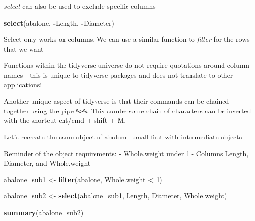 \documentclass[
]{book}
\newenvironment{Shaded}{\begin{snugshade}}{\end{snugshade}}
\newcommand{\CommentTok}[1]{\textcolor[rgb]{0.56,0.35,0.01}{\textit{#1}}}
\newcommand{\DecValTok}[1]{\textcolor[rgb]{0.00,0.00,0.81}{#1}}
\newcommand{\FunctionTok}[1]{\textcolor[rgb]{0.13,0.29,0.53}{\textbf{#1}}}
\newcommand{\NormalTok}[1]{#1}
\newcommand{\OtherTok}[1]{\textcolor[rgb]{0.56,0.35,0.01}{#1}}
\newcommand{\SpecialCharTok}[1]{\textcolor[rgb]{0.81,0.36,0.00}{\textbf{#1}}}
\newcommand{\StringTok}[1]{\textcolor[rgb]{0.31,0.60,0.02}{#1}}
\begin{document}
\emph{select} can also be used to exclude specific columns

\begin{Shaded}
\begin{Highlighting}[]
\FunctionTok{select}\NormalTok{(abalone, }\SpecialCharTok{{-}}\NormalTok{Length, }\SpecialCharTok{{-}}\NormalTok{Diameter)}
\end{Highlighting}
\end{Shaded}

Select only works on columns. We can use a similar function to \emph{filter} for the rows that we want

\begin{Shaded}
\end{Shaded}

Functions within the tidyverse universe do not require quotations around column names - this is unique to tidyverse packages and does not translate to other applications!

Another unique aspect of tidyverse is that their commands can be chained together using the pipe \texttt{\%\textgreater{}\%}. This cumbersome chain of characters can be inserted with the shortcut cnt/cmd + shift + M.

Let's recreate the same object of abalone\_small first with intermediate objects

Reminder of the object requirements:
- Whole.weight under 1
- Columns Length, Diameter, and Whole.weight

\begin{Shaded}
\begin{Highlighting}[]
\NormalTok{abalone\_sub1 }\OtherTok{\textless{}{-}} \FunctionTok{filter}\NormalTok{(abalone, Whole.weight }\SpecialCharTok{\textless{}} \DecValTok{1}\NormalTok{)}

\NormalTok{abalone\_sub2 }\OtherTok{\textless{}{-}} \FunctionTok{select}\NormalTok{(abalone\_sub1, Length, Diameter, Whole.weight)}

\FunctionTok{summary}\NormalTok{(abalone\_sub2)}
\end{Highlighting}
\end{Shaded}
\end{document}
